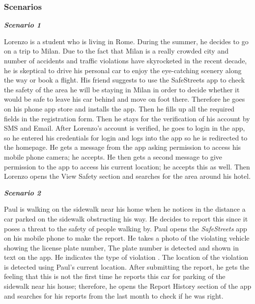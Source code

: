 \subsubsection{Scenarios}
\begin{flushleft}\emph{\textbf{Scenario 1}}\end{flushleft}

Lorenzo is a student who is living in Rome. During the summer, he decides to go on a trip to Milan. Due to the fact that Milan is a really crowded city and number of accidents and traffic violations have skyrocketed in the recent decade, he is skeptical to drive his personal car to enjoy the eye-catching scenery along the way or book a flight. His friend suggests to use the SafeStreets app to check the safety of the area he will be staying in Milan in order to decide whether it would be safe to leave his car behind and move on foot there. Therefore he goes on his phone app store and installs the app. Then he fills up all the required fields in the registration form. Then he stays for the verification of his account by SMS and Email. After Lorenzo's account is verified, he goes to login in the app, so he entered his credentials for login and logs into the app so he is redirected to the homepage. He gets a message from the app asking permission to access his mobile phone camera; he accepts. He then gets a second message to give permission to the app to access his current location; he accepts this as well. Then Lorenzo opens the View Safety section and searches for the area around his hotel.

\begin{flushleft}\emph{\textbf{Scenario 2}}\end{flushleft}


Paul is walking on the sidewalk near his home when he notices in the distance a car parked on the sidewalk obstructing his way. He decides to report this since it poses a threat to the safety of people walking by. Paul opens the \emph{SafeStreets} app on his mobile phone to make the report. He takes a photo of the violating vehicle showing the license plate number, The plate number is detected and shown in text on the app. He indicates the type of violation . The location of the violation is detected using Paul's current location. After submitting the report, he gets the feeling that this is not the first time he reports this car for parking of the sidewalk near his house; therefore, he opens the Report History section of the app and searches for his reports from the last month to check if he was right.

